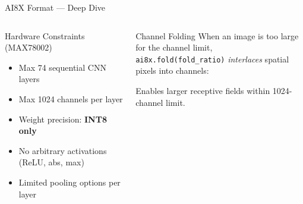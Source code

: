 \documentclass[aspectratio=169,10pt]{beamer}
\begin{document}
\begin{frame}{AI8X Format — Deep Dive}
  \begin{columns}[T]
    \begin{block}{Hardware Constraints (MAX78002)}
      {\small
      \begin{itemize}
        \item Max \alert{74 sequential CNN layers}
        \item Max \alert{1024 channels} per layer
        \item Weight precision: \textbf{INT8 only}
        \item No arbitrary activations (ReLU, abs, max)
        \item Limited pooling options per layer
      \end{itemize}}
    \end{block}
    \vspace{4pt}
    \begin{block}{Channel Folding}
      {\small When an image is too large for the channel limit,\\
      \texttt{ai8x.fold(fold\_ratio)} \textit{interlaces} spatial pixels into channels:}
      \vspace{4pt}
      {\small\par Enables larger receptive fields within 1024-channel limit.}
    \end{block}


\end{columns}
\end{frame}
\end{document}
